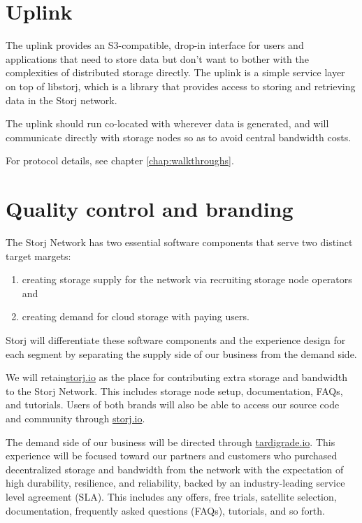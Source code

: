 \documentclass[11pt,fleqn,openany]{book}
\begin{document}
\section{Uplink}

The uplink provides an S3-compatible, drop-in interface for users and
applications that
need to store data but don't want to bother with the complexities of distributed
storage directly. The uplink is a simple service layer on top of libstorj,
which is a library that provides access to storing and retrieving data in the
Storj network.

The uplink should run co-located with wherever data is generated, and will
communicate directly with storage nodes so as to avoid central bandwidth costs.

For protocol details, see chapter \ref{chap:walkthroughs}.

\section{Quality control and branding}\label{sec:qc}

The Storj Network has two essential software components that serve two distinct
target margets:

\begin{enumerate}
\item creating storage supply for the network via recruiting storage node
  operators and
\item creating demand for cloud storage with paying users.
\end{enumerate}

Storj will differentiate these software components and the experience design
for each segment by separating the supply side of our business from the
demand side.

We will retain\url{storj.io} as the place for contributing extra storage and
bandwidth to the Storj Network. This includes storage node setup, documentation,
FAQs, and tutorials. Users of both brands will also be able to access our
source code and community through \url{storj.io}.

The demand side of our business will be directed through \url{tardigrade.io}.
This experience will be focused toward our partners and customers who purchased
decentralized storage and bandwidth from the network with the expectation of
high durability, resilience, and reliability, backed by an industry-leading
service level agreement (SLA). This includes any offers, free trials, satellite
selection, documentation, frequently asked questions (FAQs), tutorials, and so forth.
\end{document}
